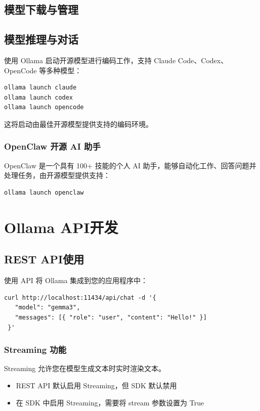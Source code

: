 \documentclass[12pt,UTF8]{ctexbook}
\begin{document}
\section{模型下载与管理}
\section{模型推理与对话}

使用 Ollama 启动开源模型进行编码工作，支持 Claude Code、Codex、OpenCode 等多种模型：

\begin{verbatim}
ollama launch claude
ollama launch codex
ollama launch opencode
\end{verbatim}

这将启动由最佳开源模型提供支持的编码环境。

\subsection{OpenClaw 开源 AI 助手}

OpenClaw 是一个具有 100+ 技能的个人 AI 助手，能够自动化工作、回答问题并处理任务，由开源模型提供支持：

\begin{verbatim}
ollama launch openclaw
\end{verbatim}

\chapter{Ollama API开发}
\section{REST API使用}

使用 API 将 Ollama 集成到您的应用程序中：
\begin{verbatim}
curl http://localhost:11434/api/chat -d '{ 
   "model": "gemma3", 
   "messages": [{ "role": "user", "content": "Hello!" }] 
 }'
\end{verbatim}

\subsection{Streaming 功能}
Streaming 允许您在模型生成文本时实时渲染文本。

\begin{itemize}
  \item REST API 默认启用 Streaming，但 SDK 默认禁用
  \item 在 SDK 中启用 Streaming，需要将 stream 参数设置为 True
\end{itemize}
\end{document}
